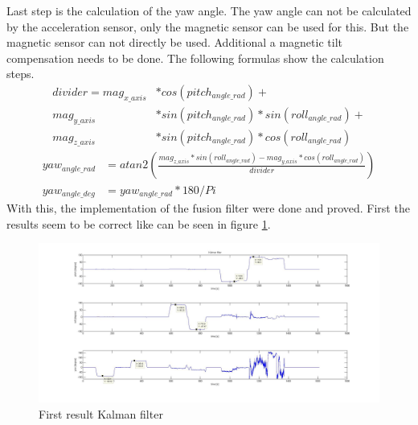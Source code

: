 Last step is the calculation of the yaw angle. The yaw angle can not be calculated by the acceleration sensor, only the magnetic sensor can be used for this. But the magnetic sensor can not directly be used. Additional a magnetic tilt compensation needs to be done. The following formulas show the calculation steps.\\
\begin{align}
divider=mag_{x\_axis}&*cos(pitch_{angle\_rad})+\\
mag_{y\_axis}&*sin(pitch_{angle\_rad})*sin(roll_{angle\_rad})+\\
mag_{z\_axis}&*sin(pitch_{angle\_rad})*cos(roll_{angle\_rad})
\end{align}
\begin{align}		
yaw_{angle\_rad}&=atan2\left(\frac{mag_{z\_axis}*sin(roll_{angle\_rad})-mag_{y\_axis}*cos(roll_{angle\_rad})}{divider}\right)\\
yaw_{angle\_deg}&=yaw_{angle\_rad}*180/Pi
\end{align}
With this, the implementation of the fusion filter were done and proved. First the results seem to be correct like can be seen in figure \ref{fig:initial_angle}.

\begin{figure}[H]
	\centering\includegraphics[width=1.0\textwidth]{fig/initial_Kalman}
	\caption{First result Kalman filter}
	\label{fig:initial_angle}
\end{figure}
